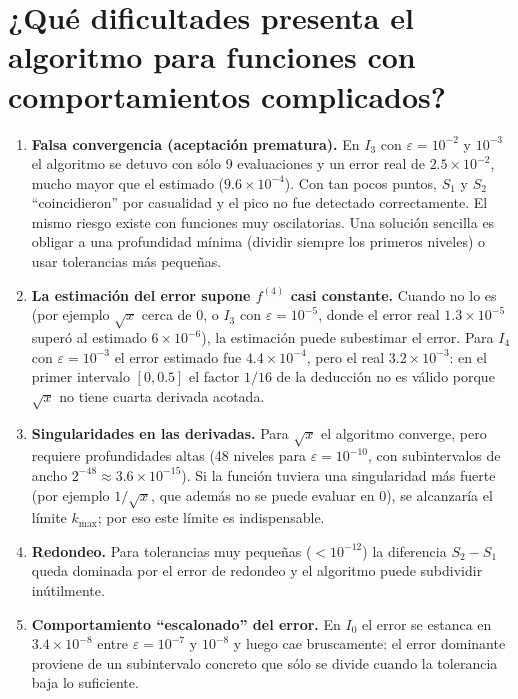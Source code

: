 \documentclass[11pt,letterpaper]{report}
\begin{document}
\section{¿Qué dificultades presenta el algoritmo para funciones con comportamientos complicados?}
\label{sec:dificultades}
\begin{enumerate}
  \item \textbf{Falsa convergencia (aceptación prematura).} En $I_3$ con $\varepsilon=10^{-2}$ y
        $10^{-3}$ el algoritmo se detuvo con sólo 9 evaluaciones y un error real de $2.5\times10^{-2}$,
        mucho mayor que el estimado ($9.6\times10^{-4}$). Con tan pocos puntos, $S_1$ y $S_2$
        ``coincidieron'' por casualidad y el pico no fue detectado correctamente. El mismo riesgo
        existe con funciones muy oscilatorias. Una solución sencilla es obligar a una profundidad
        mínima (dividir siempre los primeros niveles) o usar tolerancias más pequeñas.
  \item \textbf{La estimación del error supone $f^{(4)}$ casi constante.} Cuando no lo es
        (por ejemplo $\sqrt{x}$ cerca de 0, o $I_3$ con $\varepsilon=10^{-5}$, donde el error real
        $1.3\times10^{-5}$ superó al estimado $6\times10^{-6}$), la estimación puede subestimar
        el error. Para $I_4$ con $\varepsilon=10^{-3}$ el error estimado fue $4.4\times10^{-4}$, pero el
        real $3.2\times10^{-3}$: en el primer intervalo $[0,0.5]$ el factor $1/16$ de la deducción no
        es válido porque $\sqrt{x}$ no tiene cuarta derivada acotada.
  \item \textbf{Singularidades en las derivadas.} Para $\sqrt{x}$ el algoritmo converge, pero
        requiere profundidades altas (48 niveles para $\varepsilon=10^{-10}$, con subintervalos de
        ancho $2^{-48}\approx3.6\times10^{-15}$). Si la función tuviera una singularidad más fuerte
        (por ejemplo $1/\sqrt{x}$, que además no se puede evaluar en 0), se alcanzaría el límite
        $k_{\max}$; por eso este límite es indispensable.
  \item \textbf{Redondeo.} Para tolerancias muy pequeñas ($<10^{-12}$) la diferencia $S_2-S_1$
        queda dominada por el error de redondeo y el algoritmo puede subdividir inútilmente.
  \item \textbf{Comportamiento ``escalonado'' del error.} En $I_0$ el error se estanca en
        $3.4\times10^{-8}$ entre $\varepsilon=10^{-7}$ y $10^{-8}$ y luego cae bruscamente: el
        error dominante proviene de un subintervalo concreto que sólo se divide cuando la
        tolerancia baja lo suficiente.
\end{enumerate}
\end{document}

